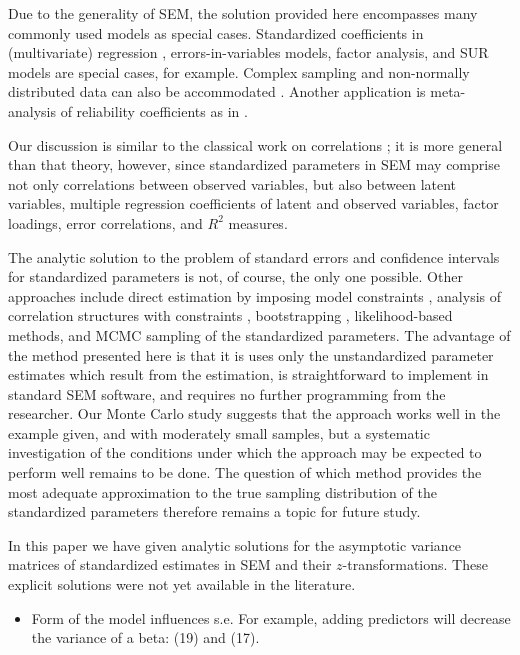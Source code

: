 \documentclass[a4paper,11pt]{article}
\newcommand{\0}{\boldsymbol{0}}
\begin{document}

\vspace{12pt}
Due to the generality of SEM, the solution provided here encompasses many commonly used models as special cases. Standardized
coefficients in (multivariate) regression \citep[discussed in ][121]{bollen1990direct}, 
errors-in-variables models, factor analysis, and SUR models are special cases, for example. 
Complex sampling and non-normally distributed data can also be accommodated  \citep{muthen1995complex}. Another  application is meta-analysis of reliability coefficients as in \cite{andrews_construct_1984,scherpenzeel_validity_1997,saris_estimation_2007,alwin_margins_2007}.

Our discussion is similar to the classical work on correlations 
\citep[e.g.][chapter 32]{johnson1995distributions}; it is more general than that theory, however,
since standardized parameters in SEM may comprise not only correlations between observed variables, but
also between latent variables, multiple regression coefficients of latent and observed variables, factor loadings, 
error correlations, and $R^2$ measures.


The analytic solution to the problem of standard errors and confidence intervals for standardized parameters
 is not, of course, the only  one possible. Other approaches include
direct estimation by imposing model constraints \citep{chan2009testing}, analysis of correlation structures with constraints \citep{bentler1983covariance}, bootstrapping , likelihood-based methods, and MCMC sampling of the standardized parameters. The advantage of the method presented here is that it is uses only the unstandardized parameter estimates which result from the estimation, is  straightforward to implement in standard SEM software, and requires no further
programming from the researcher. Our Monte Carlo study suggests that the approach works well in the example given, and with
moderately small samples, but a systematic investigation of the conditions under which the approach may
be expected to perform well remains to be done.
The question of which 
method provides the most adequate approximation to the true sampling distribution of the standardized parameters therefore remains
a topic for future study.

In this paper we have given analytic solutions for the asymptotic variance matrices of standardized estimates in SEM and their 
$z$-transformations. These explicit solutions were not yet available in the literature. 


\begin{itemize}
\item Form of the model influences s.e. For example, adding predictors will decrease the variance of a beta: (19) and (17).
\end{itemize}


\end{document}
